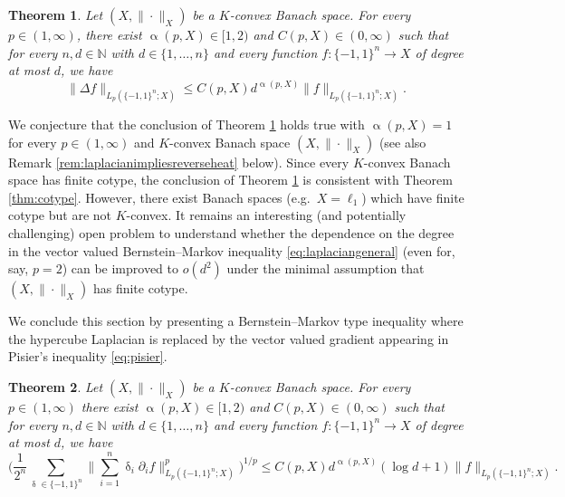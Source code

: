 \documentclass[11pt,reqno]{amsart}
\renewcommand{\leq}{\leqslant}
\newcommand{\1}{\mathbf 1}
\newtheorem{theorem}{Theorem}
\theoremstyle{remark}
\newcommand{\N}{\mathbb N}
\renewcommand{\alpha}{\upalpha}
\renewcommand{\delta}{\updelta}
\begin{document}
\begin{theorem} \label{thm:laplacianKconvex}
Let $(X,\|\cdot\|_X)$ be a $K$-convex Banach space. For every $p\in(1,\infty)$, there exist $\alpha(p,X) \in [1,2)$ and $C(p,X)\in(0,\infty)$ such that for every $n,d\in\N$ with $d\in\{1,\ldots,n\}$ and every function $f:\{-1,1\}^n \to X$ of degree at most $d$, we have
\begin{equation} \label{eq:laplacianKconvex}
\|\Delta f\|_{L_p(\{-1,1\}^n;X)} \leq C(p,X) d^{\alpha(p,X)} \|f\|_{L_p(\{-1,1\}^n;X)}.
\end{equation}
\end{theorem}

We conjecture that the conclusion of Theorem \ref{thm:laplacianKconvex} holds true with $\alpha(p,X)=1$ for every $p\in(1,\infty)$ and $K$-convex Banach space $(X,\|\cdot\|_X)$ (see also Remark \ref{rem:laplacianimpliesreverseheat} below). Since every $K$-convex Banach space has finite cotype, the conclusion of Theorem \ref{thm:laplacianKconvex} is consistent with Theorem \ref{thm:cotype}. However, there exist Banach spaces (e.g.~$X=\ell_1$) which have finite cotype but are not $K$-convex. It remains an interesting (and potentially challenging) open problem to understand whether the dependence on the degree in the vector valued Bernstein--Markov inequality \eqref{eq:laplaciangeneral} (even for, say, $p=2$) can be improved to $o(d^2)$ under the minimal assumption that $(X,\|\cdot\|_X)$ has finite cotype.

We conclude this section by presenting a Bernstein--Markov type inequality where the hypercube Laplacian is replaced by the vector valued gradient appearing in Pisier's inequality \eqref{eq:pisier}.

\begin{theorem} \label{thm:gradientKconvex}
Let $(X,\|\cdot\|_X)$ be a $K$-convex Banach space. For every $p\in(1,\infty)$ there exist $\alpha(p,X) \in [1,2)$ and $C(p,X)\in(0,\infty)$ such that for every $n,d\in\N$ with $d\in\{1,\ldots,n\}$ and every function $f:\{-1,1\}^n \to X$ of degree at most $d$, we have
\begin{equation} \label{eq:gradientKconvex}
\Big( \frac{1}{2^n} \sum_{\delta\in\{-1,1\}^n} \Big\| \sum_{i=1}^n \delta_i \partial_i f\Big\|_{L_p(\{-1,1\}^n;X)}^p \Big)^{1/p} \leq C(p,X) d^{\alpha(p,X)} (\log d+1) \|f\|_{L_p(\{-1,1\}^n;X)}.
\end{equation}
\end{theorem}
\end{document}
